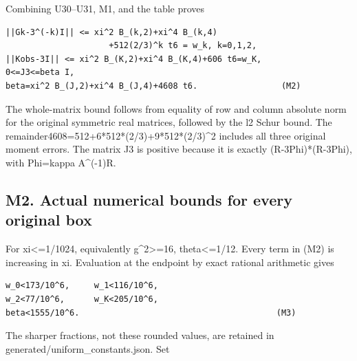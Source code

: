 \documentclass[11pt,a4paper]{article}
\renewcommand{\[}{\begingroup\small\originaldisplaystart}
\renewcommand{\]}{\originaldisplayend\endgroup}
\begin{document}
Combining U30--U31, M1, and the table proves

\begin{verbatim}
||Gk-3^(-k)I|| <= xi^2 B_(k,2)+xi^4 B_(k,4)
                     +512(2/3)^k t6 = w_k, k=0,1,2,
||Kobs-3I|| <= xi^2 B_(K,2)+xi^4 B_(K,4)+606 t6=w_K,
0<=J3<=beta I,
beta=xi^2 B_(J,2)+xi^4 B_(J,4)+4608 t6.                 (M2)
\end{verbatim}

The whole-matrix bound follows from equality of row and column absolute
norm for the original symmetric real matrices, followed by the l2 Schur
bound. The
{r\allowbreak{}e\allowbreak{}m\allowbreak{}a\allowbreak{}i\allowbreak{}n\allowbreak{}d\allowbreak{}e\allowbreak{}r\allowbreak{}4\allowbreak{}6\allowbreak{}0\allowbreak{}8\allowbreak{}=\allowbreak{}5\allowbreak{}1\allowbreak{}2\allowbreak{}+\allowbreak{}6\allowbreak{}*\allowbreak{}5\allowbreak{}1\allowbreak{}2\allowbreak{}*\allowbreak{}(\allowbreak{}2\allowbreak{}/\allowbreak{}3\allowbreak{})\allowbreak{}+\allowbreak{}9\allowbreak{}*\allowbreak{}5\allowbreak{}1\allowbreak{}2\allowbreak{}*\allowbreak{}(\allowbreak{}2\allowbreak{}/\allowbreak{}3\allowbreak{})\allowbreak{}\textasciicircum{}\allowbreak{}2\allowbreak{}}
includes all three original moment errors. The matrix J3 is positive
because it is exactly (R-3Phi)*(R-3Phi), with Phi=kappa A\^{}(-1)R.

\subsection{M2. Actual numerical bounds for every original
box}\label{m2.-actual-numerical-bounds-for-every-original-box}

For xi\textless=1/1024, equivalently g\^{}2\textgreater=16,
theta\textless=1/12. Every term in (M2) is increasing in xi. Evaluation
at the endpoint by exact rational arithmetic gives

\begin{verbatim}
w_0<173/10^6,     w_1<116/10^6,
w_2<77/10^6,      w_K<205/10^6,
beta<1555/10^6.                                        (M3)
\end{verbatim}

The sharper fractions, not these rounded values, are retained in
{g\allowbreak{}e\allowbreak{}n\allowbreak{}e\allowbreak{}r\allowbreak{}a\allowbreak{}t\allowbreak{}e\allowbreak{}d\allowbreak{}/\allowbreak{}u\allowbreak{}n\allowbreak{}i\allowbreak{}f\allowbreak{}o\allowbreak{}r\allowbreak{}m\allowbreak{}\_\allowbreak{}c\allowbreak{}o\allowbreak{}n\allowbreak{}s\allowbreak{}t\allowbreak{}a\allowbreak{}n\allowbreak{}t\allowbreak{}s\allowbreak{}.\allowbreak{}j\allowbreak{}s\allowbreak{}o\allowbreak{}n\allowbreak{}.\allowbreak{}}
Set
\end{document}
